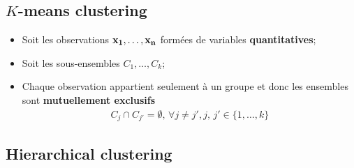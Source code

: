\documentclass[10pt, french]{article}
\begin{document}
\begin{multicols*}{3}
\subsection*{$K$-means clustering}
\begin{distributions}[Notation]
\begin{itemize}[leftmargin = *]
	\item	Soit les observations $\mathbf{x_{1}, \dots, x_{n}}$ formées de variables \textbf{quantitatives};
	\item	Soit les sous-ensembles $C_{1}, \dots, C_{k}$;
	\item	Chaque observation appartient seulement à un groupe et donc les ensembles sont \textbf{mutuellement exclusifs}
		\begin{align*}
		C_{j} \cap C_{j'} = \emptyset, \, \forall j \neq j', j, \, j' \in \{1, \dots, k\}
		\end{align*}
\end{itemize}
\end{distributions}

\subsection*{Hierarchical clustering}

\end{multicols*}
\end{document}
